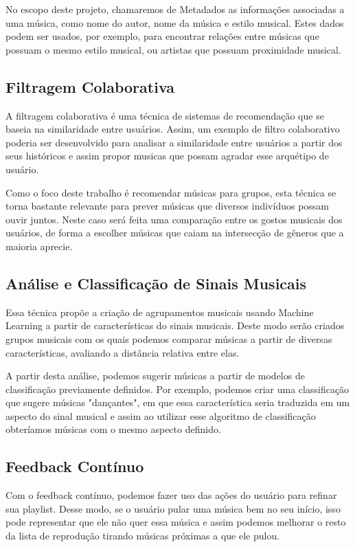 \documentclass[
	12pt,				%
    oneside,			%
	a4paper,			%
	english,			%
	french,				%
	spanish,			%
	brazil,				%
	]{abntex2}
\begin{document}
No escopo deste projeto, chamaremos de Metadados as informações associadas a uma música, como nome do autor, nome da música e estilo musical. Estes dados podem ser usados, por exemplo, para encontrar relações entre músicas que possuam o mesmo estilo musical, ou artistas que possuam proximidade musical.

\subsection{Filtragem Colaborativa}
A filtragem colaborativa é uma técnica de sistemas de recomendação que se baseia na similaridade entre usuários. Assim, um exemplo de filtro colaborativo poderia ser desenvolvido para analisar a similaridade entre usuários a partir dos seus históricos e assim propor musicas que possam agradar esse arquétipo de usuário.

Como o foco deste trabalho é recomendar músicas para grupos, esta técnica se torna bastante relevante para prever músicas que diversos indivíduos possam ouvir juntos. Neste caso será feita uma comparação entre os gostos musicais dos usuários, de forma a escolher músicas que caiam na intersecção de gêneros que a maioria aprecie.


\subsection{Análise e Classificação de Sinais Musicais}
Essa técnica propõe a criação de agrupamentos musicais usando Machine Learning a partir de características do sinais musicais. Deste modo serão criados grupos musicais com os quais podemos comparar músicas a partir de diversas características, avaliando a distância relativa entre elas.

A partir desta análise, podemos sugerir músicas a partir de modelos de classificação previamente definidos. Por exemplo, podemos criar uma classificação que sugere músicas "dançantes", em que essa característica seria traduzida em um aspecto do sinal musical e assim ao utilizar esse algoritmo de classificação obteríamos músicas com o mesmo aspecto definido. 

\subsection{Feedback Contínuo}
Com o feedback contínuo, podemos fazer uso das ações do usuário para refinar sua playlist. Desse modo, se o usuário pular uma música bem no seu início, isso pode representar que ele não quer essa música e assim podemos melhorar o resto da lista de reprodução tirando músicas próximas a que ele pulou.
\end{document}
